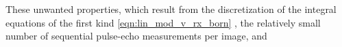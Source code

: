 These unwanted properties, which result from
%
the discretization of
the  integral equations of
the first kind
\eqref{eqn:lin_mod_v_rx_born}
\cite[]{book:Hansen2010}
\cite[2, 3]{book:Hansen1998},
the relatively small number of
sequential pulse-echo measurements per
image, and
